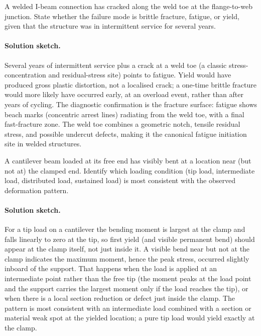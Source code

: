 \begin{exercise}
A welded I-beam connection has cracked along the weld toe at the
flange-to-web junction. State whether the failure mode is brittle
fracture, fatigue, or yield, given that the structure was in
intermittent service for several years.
\paragraph{Solution sketch.} Several years of intermittent service plus
a crack at a weld toe (a classic stress-concentration and
residual-stress site) points to fatigue. Yield would have produced
gross plastic distortion, not a localised crack; a one-time brittle
fracture would more likely have occurred early, at an overload event,
rather than after years of cycling. The diagnostic confirmation is the
fracture surface: fatigue shows beach marks (concentric arrest lines)
radiating from the weld toe, with a final fast-fracture zone. The weld
toe combines a geometric notch, tensile residual stress, and possible
undercut defects, making it the canonical fatigue initiation site in
welded structures.
\end{exercise}

\begin{exercise}
A cantilever beam loaded at its free end has visibly bent at a
location near (but not at) the clamped end. Identify which loading
condition (tip load, intermediate load, distributed load, sustained
load) is most consistent with the observed deformation pattern.
\paragraph{Solution sketch.} For a tip load on a cantilever the bending
moment is largest at the clamp and falls linearly to zero at the tip,
so first yield (and visible permanent bend) should appear at the clamp
itself, not just inside it. A visible bend near but not at the clamp
indicates the maximum moment, hence the peak stress, occurred slightly
inboard of the support. That happens when the load is applied at an
intermediate point rather than the free tip (the moment peaks at the
load point and the support carries the largest moment only if the load
reaches the tip), or when there is a local section reduction or defect
just inside the clamp. The pattern is most consistent with an
intermediate load combined with a section or material weak spot at the
yielded location; a pure tip load would yield exactly at the clamp.
\end{exercise}

